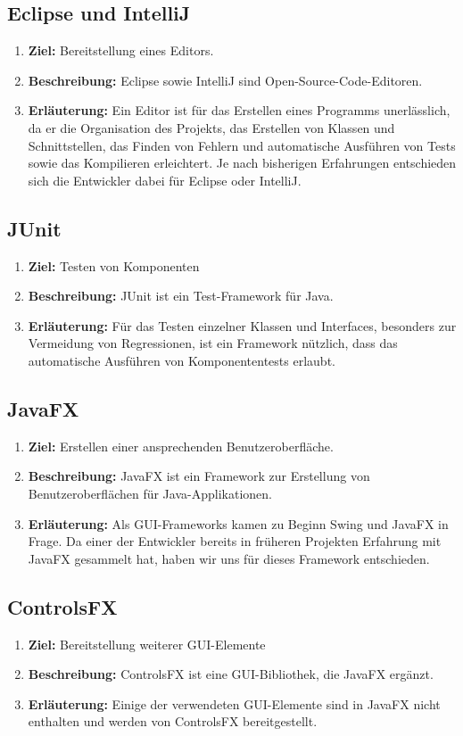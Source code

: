 \documentclass[parskip=full,11pt]{scrartcl}
\begin{document}
\subsection{Eclipse und IntelliJ}
\begin{enumerate}
\item[] \textbf{Ziel:} Bereitstellung eines Editors.
\item[] \textbf{Beschreibung:} Eclipse sowie IntelliJ sind Open-Source-Code-Editoren.
\item[] \textbf{Erläuterung:} Ein Editor ist für das Erstellen eines Programms unerlässlich, da er die Organisation des Projekts, das Erstellen von Klassen und Schnittstellen, das Finden von Fehlern und automatische Ausführen von Tests sowie das Kompilieren erleichtert. Je nach bisherigen Erfahrungen entschieden sich die Entwickler dabei für Eclipse oder IntelliJ.
\end{enumerate}
\subsection{JUnit}
\begin{enumerate}
\item[] \textbf{Ziel:} Testen von Komponenten
\item[] \textbf{Beschreibung:} JUnit ist ein Test-Framework für Java.
\item[] \textbf{Erläuterung:} Für das Testen einzelner Klassen und Interfaces, besonders zur Vermeidung von Regressionen, ist ein Framework nützlich, dass das automatische Ausführen von Komponententests erlaubt.
\end{enumerate}
\subsection{JavaFX}
\begin{enumerate}
\item[] \textbf{Ziel:} Erstellen einer ansprechenden Benutzeroberfläche.
\item[] \textbf{Beschreibung:} JavaFX ist ein Framework zur Erstellung von Benutzeroberflächen für Java-Applikationen.
\item[] \textbf{Erläuterung:} Als GUI-Frameworks kamen zu Beginn Swing und JavaFX in Frage. Da einer der Entwickler bereits in früheren Projekten Erfahrung mit JavaFX gesammelt hat, haben wir uns für dieses Framework entschieden.
\end{enumerate}
\subsection{ControlsFX}
\begin{enumerate}
\item[] \textbf{Ziel:} Bereitstellung weiterer GUI-Elemente
\item[] \textbf{Beschreibung:} ControlsFX ist eine GUI-Bibliothek, die JavaFX ergänzt.
\item[] \textbf{Erläuterung:} Einige der verwendeten GUI-Elemente sind in JavaFX nicht enthalten und werden von ControlsFX bereitgestellt.
\end{enumerate}
\end{document}
